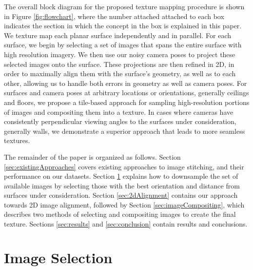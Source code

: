 \documentclass{llncs}
\begin{document}
The overall block diagram for the proposed texture mapping procedure
is shown in Figure \ref{fig:flowchart}, where the number attached
attached to each box indicates the section in which the concept in the
box is explained in this paper. We texture map each planar surface
independently and in parallel. For each surface, we begin by selecting
a set of images that spans the entire surface with high resolution
imagery. We then use our noisy camera poses to project these selected
images onto the surface. These projections are then refined in 2D, in
order to maximally align them with the surface's geometry, as well as
to each other, allowing us to handle both errors in geometry as well
as camera poses. For surfaces and camera poses at arbitrary locations
or orientations, generally ceilings and floors, we propose a
tile-based approach for sampling high-resolution portions of images
and compositing them into a texture. In cases where cameras have
consistently perpendicular viewing angles to the surfaces under
consideration, generally walls, we demonstrate a superior approach
that leads to more seamless textures.

The remainder of the paper is organized as follows. Section
\ref{sec:existingApproaches} covers existing approaches to image
stitching, and their performance on our datasets. Section
\ref{sec:simpleTextureMapping} explains how to downsample the set of
available images by selecting those with the best orientation and
distance from surfaces under consideration. Section
\ref{sec:2dAlignment} contains our approach towards 2D image
alignment, followed by Section \ref{sec:imageCompositing}, which
describes two methods of selecting and compositing images to create
the final texture. Sections \ref{sec:results} and \ref{sec:conclusion}
contain results and conclusions.



\section{Image Selection}
\label{sec:simpleTextureMapping}


\end{document}
